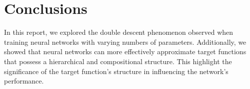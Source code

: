 


\section{Conclusions}
In this report, we explored the double descent phenomenon observed
when training neural networks with varying numbers of parameters.
Additionally, we showed that neural networks can more effectively
approximate target functions that possess a hierarchical and
compositional structure. This highlight the significance of the
target function's structure in influencing the network's performance.
